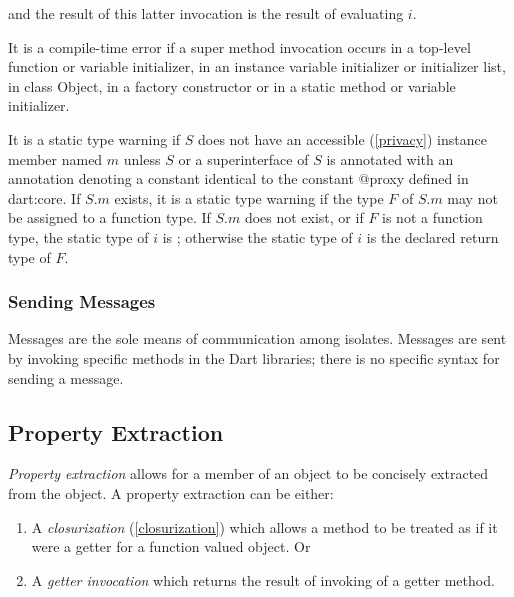\documentclass{article}
\newcommand{\code}[1]{{\sf #1}}
\begin{document}
and the result of this latter invocation is the result of evaluating $i$.


\LMHash{}
It is a compile-time error if a super method invocation occurs in a top-level function or variable initializer, in an instance variable initializer or initializer list, in class \code{Object}, in a factory constructor or in a static method or variable initializer.

\LMHash{}
It is a static type warning if $S$ does not have an accessible (\ref{privacy}) instance member named $m$ unless $S$ or a superinterface of $S$ is annotated with an annotation denoting a constant identical to the constant \code{@proxy} defined in \code{dart:core}. If $S.m$ exists, it  is a static type warning if the type $F$ of $S.m$ may not be assigned to a function type. If $S.m$ does not exist, or if $F$ is not a function type, the static type of $i$ is \DYNAMIC{}; otherwise the static type of $i$ is the declared return type of  $F$.  




\subsubsection{Sending Messages}

\LMHash{}
Messages are the sole means of communication among isolates. Messages are sent by invoking specific  methods in the Dart libraries; there is no specific syntax for sending a message. 




\subsection{ Property Extraction}

\LMHash{}
{\em Property extraction} allows for a member of an object to be concisely extracted from the object.
A property extraction can be either:
\begin{enumerate}
\item A {\em closurization} (\ref{closurization}) which allows a method to be treated as if it were a getter for a function valued object. Or
\item A {\em getter invocation} which returns the result of invoking of a getter method.
\end{enumerate}
\end{document}

